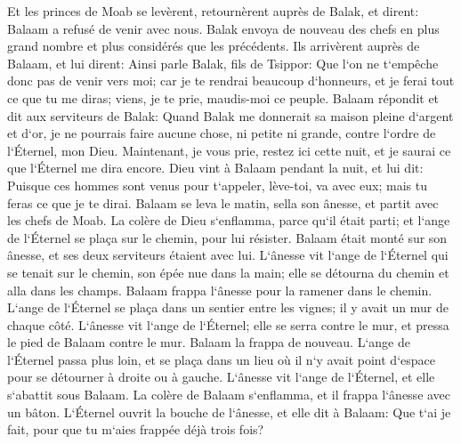 \verse Et les princes de Moab se levèrent, retournèrent auprès de Balak, et dirent: Balaam a refusé de venir avec nous. 
\verse Balak envoya de nouveau des chefs en plus grand nombre et plus considérés que les précédents. 
\verse Ils arrivèrent auprès de Balaam, et lui dirent: Ainsi parle Balak, fils de Tsippor: Que l`on ne t`empêche donc pas de venir vers moi; 
\verse car je te rendrai beaucoup d`honneurs, et je ferai tout ce que tu me diras; viens, je te prie, maudis-moi ce peuple. 
\verse Balaam répondit et dit aux serviteurs de Balak: Quand Balak me donnerait sa maison pleine d`argent et d`or, je ne pourrais faire aucune chose, ni petite ni grande, contre l`ordre de l`Éternel, mon Dieu. 
\verse Maintenant, je vous prie, restez ici cette nuit, et je saurai ce que l`Éternel me dira encore. 
\verse Dieu vint à Balaam pendant la nuit, et lui dit: Puisque ces hommes sont venus pour t`appeler, lève-toi, va avec eux; mais tu feras ce que je te dirai. 
\verse Balaam se leva le matin, sella son ânesse, et partit avec les chefs de Moab. 
\verse La colère de Dieu s`enflamma, parce qu`il était parti; et l`ange de l`Éternel se plaça sur le chemin, pour lui résister. Balaam était monté sur son ânesse, et ses deux serviteurs étaient avec lui. 
\verse L`ânesse vit l`ange de l`Éternel qui se tenait sur le chemin, son épée nue dans la main; elle se détourna du chemin et alla dans les champs. Balaam frappa l`ânesse pour la ramener dans le chemin. 
\verse L`ange de l`Éternel se plaça dans un sentier entre les vignes; il y avait un mur de chaque côté. 
\verse L`ânesse vit l`ange de l`Éternel; elle se serra contre le mur, et pressa le pied de Balaam contre le mur. Balaam la frappa de nouveau. 
\verse L`ange de l`Éternel passa plus loin, et se plaça dans un lieu où il n`y avait point d`espace pour se détourner à droite ou à gauche. 
\verse L`ânesse vit l`ange de l`Éternel, et elle s`abattit sous Balaam. La colère de Balaam s`enflamma, et il frappa l`ânesse avec un bâton. 
\verse L`Éternel ouvrit la bouche de l`ânesse, et elle dit à Balaam: Que t`ai je fait, pour que tu m`aies frappée déjà trois fois? 
